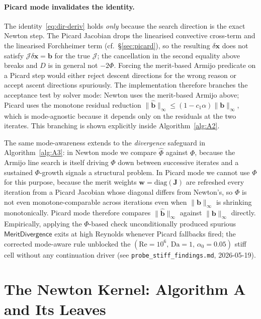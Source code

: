 \documentclass{article}
\newcommand{\code}[1]{\texttt{\small #1}}
\begin{document}
\paragraph{Picard mode invalidates the identity.}  The identity~\eqref{eq:dir-deriv}
holds \emph{only} because the search direction is the exact Newton step.
The Picard Jacobian drops the linearised convective cross-term and the
linearised Forchheimer term (cf.\ §\ref{sec:picard}), so the resulting
$\delta\boldsymbol{x}$ does not satisfy $\mathcal{J}\delta\boldsymbol{x}
= \boldsymbol{b}$ for the true $\mathcal{J}$; the cancellation in the
second equality above breaks and $D$ is in general not $-2\Phi$. Forcing
the merit-based Armijo predicate on a Picard step would either reject
descent directions for the wrong reason or accept ascent directions
spuriously. The implementation therefore branches the acceptance test by
solver mode: Newton uses the merit-based Armijo above; Picard uses the
monotone residual reduction
$\|\hat{\boldsymbol{b}}\|_\infty \le (1 - c_1 \alpha)\|\boldsymbol{b}\|_\infty$,
which is mode-agnostic because it depends only on the residuals at the
two iterates. This branching is shown explicitly inside
Algorithm~\ref{alg:A2}.

The same mode-awareness extends to the \emph{divergence} safeguard in
Algorithm~\ref{alg:A3}: in Newton mode we compare $\hat\Phi$ against
$\Phi$, because the Armijo line search is itself driving $\Phi$ down
between successive iterates and a sustained $\Phi$-growth signals a
structural problem. In Picard mode we cannot use $\Phi$ for this purpose,
because the merit weights $\boldsymbol{w} = \mathrm{diag}(\mathbf{J})$ are
refreshed every iteration from a Picard Jacobian whose diagonal differs
from Newton's, so $\Phi$ is not even monotone-comparable across iterations
even when $\|\boldsymbol{b}\|_\infty$ is shrinking monotonically. Picard
mode therefore compares $\|\hat{\boldsymbol{b}}\|_\infty$ against
$\|\boldsymbol{b}\|_\infty$ directly. Empirically, applying the
$\Phi$-based check unconditionally produced spurious
$\mathsf{MeritDivergence}$ exits at high Reynolds whenever Picard
fallbacks fired; the corrected mode-aware rule unblocked the
$(\mathrm{Re} = 10^6,\, \mathrm{Da} = 1,\, \alpha_0 = 0.05)$ stiff cell
without any continuation driver (see \code{probe\_stiff\_findings.md},
2026-05-19).

\section{The Newton Kernel: Algorithm A and Its Leaves}
\label{sec:newton}
\end{document}
